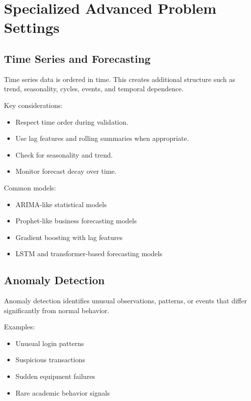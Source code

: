 \documentclass[11pt,a4paper]{article}
\begin{document}
\section{Specialized Advanced Problem Settings}

\subsection{Time Series and Forecasting}

\begin{definitionbox}
Time series data is ordered in time. This creates additional structure such as trend, seasonality, cycles, events, and temporal dependence.
\end{definitionbox}

Key considerations:
\begin{itemize}[leftmargin=*]
  \item Respect time order during validation.
  \item Use lag features and rolling summaries when appropriate.
  \item Check for seasonality and trend.
  \item Monitor forecast decay over time.
\end{itemize}

Common models:
\begin{itemize}[leftmargin=*]
  \item ARIMA-like statistical models
  \item Prophet-like business forecasting models
  \item Gradient boosting with lag features
  \item LSTM and transformer-based forecasting models
\end{itemize}

\subsection{Anomaly Detection}

\begin{definitionbox}
Anomaly detection identifies unusual observations, patterns, or events that differ significantly from normal behavior.
\end{definitionbox}

Examples:
\begin{itemize}[leftmargin=*]
  \item Unusual login patterns
  \item Suspicious transactions
  \item Sudden equipment failures
  \item Rare academic behavior signals
\end{itemize}
\end{document}
